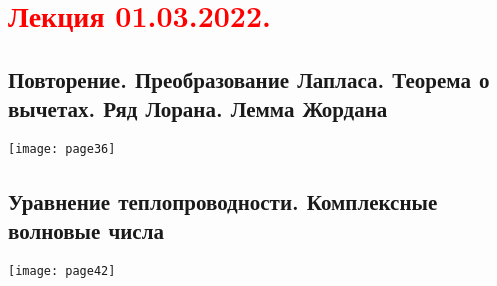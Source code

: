 \documentclass[main.tex]{subfiles}
\begin{document}
\section{\textcolor{red}{Лекция 01.03.2022.}}

\subsection{Повторение. Преобразование Лапласа. Теорема о вычетах. Ряд Лорана. Лемма Жордана}
\texttt{[image: page36]}






\subsection{Уравнение теплопроводности. Комплексные волновые числа}
\texttt{[image: page42]}



\end{document}
